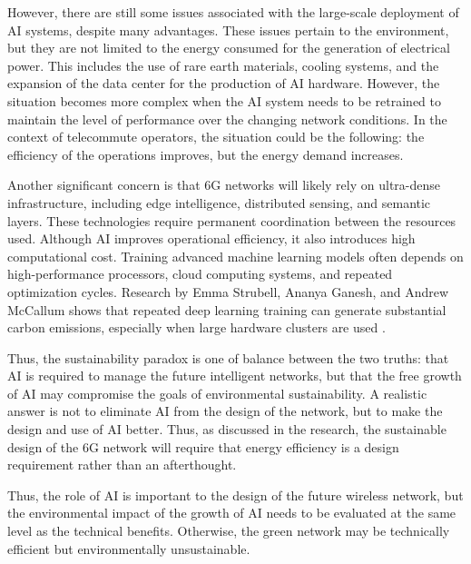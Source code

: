 \documentclass[letterpaper]{article} %
\begin{document}
However, there are still some issues associated with the large-scale deployment of AI systems, despite many advantages. These issues pertain to the environment, but they are not limited to the energy consumed for the generation of electrical power. This includes the use of rare earth materials, cooling systems, and the expansion of the data center for the production of AI hardware. However, the situation becomes more complex when the AI system needs to be retrained to maintain the level of performance over the changing network conditions. In the context of telecommute operators, the situation could be the following: the efficiency of the operations improves, but the energy demand increases.

Another significant concern is that 6G networks will likely rely on ultra-dense infrastructure, including edge intelligence, distributed sensing, and semantic layers. These technologies require permanent coordination between the resources used. Although AI improves operational efficiency, it also introduces high computational cost. Training advanced machine learning models often depends on high-performance processors, cloud computing systems, and repeated optimization cycles. Research by Emma Strubell, Ananya Ganesh, and Andrew McCallum shows that repeated deep learning training can generate substantial carbon emissions, especially when large hardware clusters are used \cite{strubell_energy_2020}.

Thus, the sustainability paradox is one of balance between the two truths: that AI is required to manage the future intelligent networks, but that the free growth of AI may compromise the goals of environmental sustainability. A realistic answer is not to eliminate AI from the design of the network, but to make the design and use of AI better. Thus, as discussed in the research, the sustainable design of the 6G network will require that energy efficiency is a design requirement rather than an afterthought.

Thus, the role of AI is important to the design of the future wireless network, but the environmental impact of the growth of AI needs to be evaluated at the same level as the technical benefits. Otherwise, the green network may be technically efficient but environmentally unsustainable.

\end{document}
